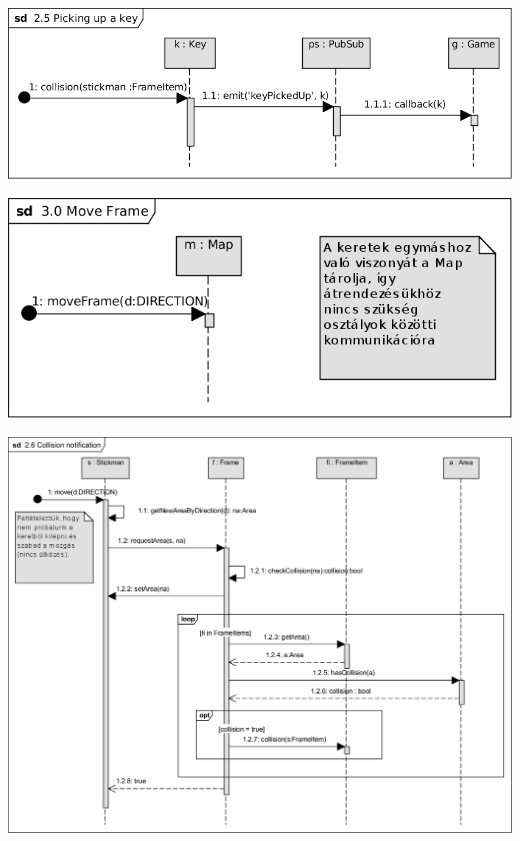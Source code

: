 \begin{center}\includegraphics[scale=1]{resources/25Pickingupakey.png}\end{center}
\begin{center}\includegraphics[scale=1]{resources/30MoveFrame.png}\end{center}
\begin{center}\includegraphics[scale=0.8, angle=-90]{resources/26Collisionnotification.png}\end{center}

